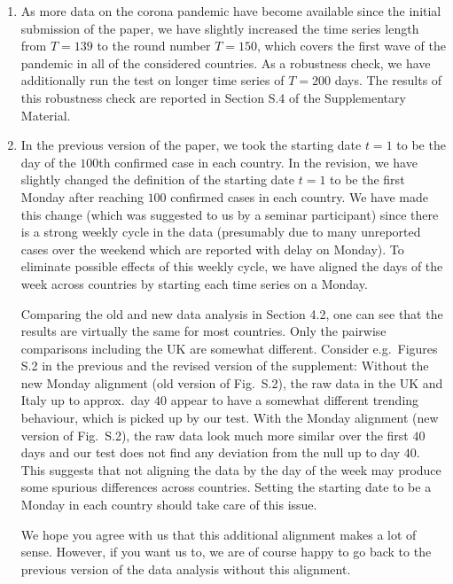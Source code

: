 \documentclass[a4paper,12pt]{article}
\begin{document}
\begin{enumerate}[label=(\roman*), leftmargin=0.8cm]

\item As more data on the corona pandemic have become available since the initial submission of the paper, we have slightly increased the time series length from $T=139$ to the round number $T=150$, which covers the first wave of the pandemic in all of the considered countries. As a robustness check, we have additionally run the test on longer time series of $T=200$ days. The results of this robustness check are reported in Section S.4 of the Supplementary Material. 

\item In the previous version of the paper, we took the starting date $t=1$ to be the day of the $100$th confirmed case in each country. In the revision, we have slightly changed the definition of the starting date $t=1$ to be the first Monday after reaching $100$ confirmed cases in each country. We have made this change (which was suggested to us by a seminar participant) since there is a strong weekly cycle in the data (presumably due to many unreported cases over the weekend which are reported with delay on Monday). To eliminate possible effects of this weekly cycle, we have aligned the days of the week across countries by starting each time series on a Monday. 

Comparing the old and new data analysis in Section 4.2, one can see that the results are virtually the same for most countries. Only the pairwise comparisons including the UK are somewhat different. Consider e.g.\ Figures S.2 in the previous and the revised version of the supplement: Without the new Monday alignment (old version of Fig.\ S.2), the raw data in the UK and Italy up to approx.\ day $40$ appear to have a somewhat different trending behaviour, which is picked up by our test. With the Monday alignment (new version of Fig.\ S.2), the raw data look much more similar over the first $40$ days and our test does not find any deviation from the null up to day $40$. This suggests that not aligning the data by the day of the week may produce some spurious differences across countries. Setting the starting date to be a Monday in each country should take care of this issue. 

We hope you agree with us that this additional alignment makes a lot of sense. However, if you want us to, we are of course happy to go back to the previous version of the data analysis without this alignment. 

\end{enumerate}
\end{document}
